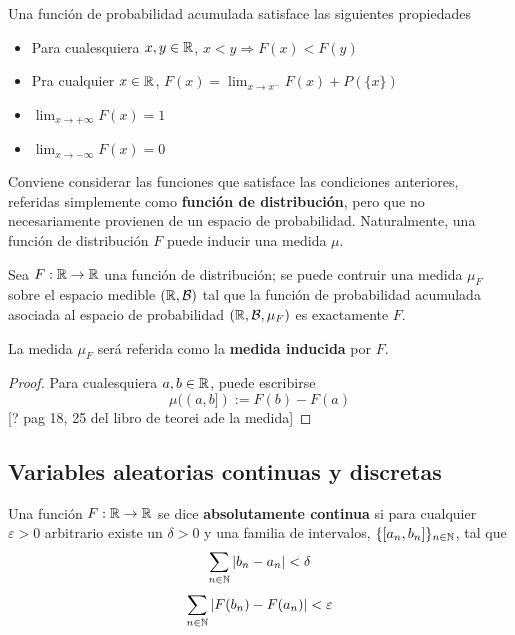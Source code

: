 Una función de probabilidad acumulada satisface las siguientes propiedades
\begin{itemize}
\item Para cualesquiera $x,y\in \mathbb{R}$, $x < y \Rightarrow F(x) < F(y)$
\item Pra cualquier $x\in\mathbb{R}$, $F(x) = \lim_{x\rightarrow x^{-}} F(x) + P(\{x\})$
\item $\lim_{x\rightarrow +\infty} F(x) = 1$
\item $\lim_{x\rightarrow -\infty} F(x) = 0$
\end{itemize}

Conviene considerar las funciones que satisface las condiciones anteriores, referidas simplemente como \textbf{función de distribución}, pero que no necesariamente provienen de un espacio de probabilidad. Naturalmente, una función de distribución $F$ puede inducir una medida $\mu$.

\begin{teorema}
Sea $F:\mathbb{R} \rightarrow \mathbb{R}$ una función de distribución; se puede contruir una medida $\mu_F$ sobre el espacio medible $(\mathbb{R}, \mathcal{B})$ tal que la función de probabilidad acumulada asociada al espacio de probabilidad $(\mathbb{R}, \mathcal{B}, \mu_F)$ es exactamente $F$.

La medida $\mu_F$ será referida como la \textbf{medida inducida} por $F$.
\end{teorema}
\begin{proof}
Para cualesquiera $a, b \in \mathbb{R}$, puede escribirse
\begin{equation}
\mu((a,b]) := F(b) - F(a)
\end{equation}
[? pag 18, 25 del libro de teorei ade la medida]
\end{proof}


\subsection{Variables aleatorias continuas y discretas}

\begin{definicion}
Una función $F: \mathbb{R} \rightarrow \mathbb{R}$ se dice \textbf{absolutamente continua} si para cualquier $\varepsilon>0$ arbitrario existe un $\delta>0$ y una familia de intervalos, $\{ [a_n, b_n]\}_{n\in \mathbb{N}}$, tal que
\begin{equation}
\sum_{n\in \mathbb{N}} \left| b_n - a_n \right| < \delta 
\end{equation}
\begin{equation}
\sum_{n\in \mathbb{N}} \left| F(b_n) - F(a_n) \right| < \varepsilon 
\end{equation}
\end{definicion}

